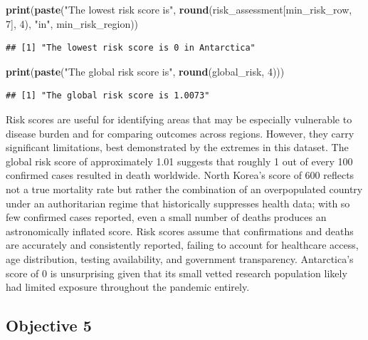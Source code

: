 \documentclass[
]{article}
\newenvironment{Shaded}{\begin{snugshade}}{\end{snugshade}}
\newcommand{\DecValTok}[1]{\textcolor[rgb]{0.00,0.00,0.81}{#1}}
\newcommand{\FunctionTok}[1]{\textcolor[rgb]{0.13,0.29,0.53}{\textbf{#1}}}
\newcommand{\NormalTok}[1]{#1}
\newcommand{\StringTok}[1]{\textcolor[rgb]{0.31,0.60,0.02}{#1}}
\begin{document}
\begin{Shaded}
\begin{Highlighting}[]
\FunctionTok{print}\NormalTok{(}\FunctionTok{paste}\NormalTok{(}\StringTok{"The lowest risk score is"}\NormalTok{, }\FunctionTok{round}\NormalTok{(risk\_assessment[min\_risk\_row, }\DecValTok{7}\NormalTok{], }\DecValTok{4}\NormalTok{), }\StringTok{"in"}\NormalTok{, min\_risk\_region))}
\end{Highlighting}
\end{Shaded}

\begin{verbatim}
## [1] "The lowest risk score is 0 in Antarctica"
\end{verbatim}

\begin{Shaded}
\begin{Highlighting}[]
\FunctionTok{print}\NormalTok{(}\FunctionTok{paste}\NormalTok{(}\StringTok{"The global risk score is"}\NormalTok{, }\FunctionTok{round}\NormalTok{(global\_risk, }\DecValTok{4}\NormalTok{)))}
\end{Highlighting}
\end{Shaded}

\begin{verbatim}
## [1] "The global risk score is 1.0073"
\end{verbatim}

Risk scores are useful for identifying areas that may be especially
vulnerable to disease burden and for comparing outcomes across regions.
However, they carry significant limitations, best demonstrated by the
extremes in this dataset. The global risk score of approximately 1.01
suggests that roughly 1 out of every 100 confirmed cases resulted in
death worldwide. North Korea's score of 600 reflects not a true
mortality rate but rather the combination of an overpopulated country
under an authoritarian regime that historically suppresses health data;
with so few confirmed cases reported, even a small number of deaths
produces an astronomically inflated score. Risk scores assume that
confirmations and deaths are accurately and consistently reported,
failing to account for healthcare access, age distribution, testing
availability, and government transparency. Antarctica's score of 0 is
unsurprising given that its small vetted research population likely had
limited exposure throughout the pandemic entirely.

\subsection{Objective 5}\label{objective-5}
\end{document}
